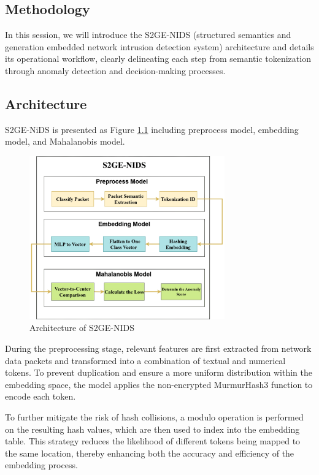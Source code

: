 \begin{ZhChapter}

\chapter{Methodology}
In this session, we will introduce the S2GE-NIDS (structured semantics and generation embedded network intrusion detection system) architecture and details its operational workflow, clearly delineating each step from semantic tokenization through anomaly detection and decision-making processes.
\section{Architecture} %
S2GE-NiDS is presented as Figure \ref{fig: Architecture} including preprocess model, embedding model, and Mahalanobis model.

\begin{figure}[htbp]
    \centering
    \includegraphics[width = 0.75\textwidth]{image/Flow.jpg}
    \caption{Architecture of S2GE-NIDS}
    \label{fig: Architecture}
\end{figure}

During the preprocessing stage, relevant features are first extracted from network data packets and transformed into a combination of textual and numerical tokens. To prevent duplication and ensure a more uniform distribution within the embedding space, the model applies the non-encrypted MurmurHash3 function to encode each token.

To further mitigate the risk of hash collisions, a modulo operation is performed on the resulting hash values, which are then used to index into the embedding table. This strategy reduces the likelihood of different tokens being mapped to the same location, thereby enhancing both the accuracy and efficiency of the embedding process.


\end{ZhChapter}
